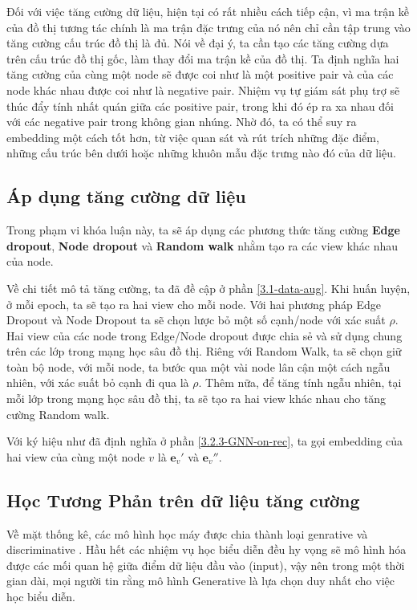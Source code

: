 Đối với việc tăng cường dữ liệu, hiện tại có rất nhiều cách tiếp cận, vì ma trận kề của đồ thị tương tác chính là ma trận đặc trưng của nó nên chỉ cần tập trung vào tăng cường cấu trúc đồ thị là đủ. Nói về đại ý, ta cần tạo các tăng cường dựa trên cấu trúc đồ thị gốc, làm thay đổi ma trận kề của đồ thị. Ta định nghĩa hai tăng cường của cùng một node sẽ được coi như là một positive pair và của các node khác nhau được coi như là negative pair. Nhiệm vụ tự giám sát phụ trợ sẽ thúc đẩy tính nhất quán giữa các positive pair, trong khi đó ép ra xa nhau đối với các negative pair trong không gian nhúng. Nhờ đó, ta có thể suy ra embedding một cách tốt hơn, từ việc quan sát và rút trích những đặc điểm, những cấu trúc bên dưới hoặc những khuôn mẫu đặc trưng nào đó của dữ liệu. 

\subsection{Áp dụng tăng cường dữ liệu}
\noindent Trong phạm vi khóa luận này, ta sẽ áp dụng các phương thức tăng cường \textbf{Edge dropout}, \textbf{Node dropout} và \textbf{Random walk} nhằm tạo ra các view khác nhau của node.

Về chi tiết mô tả tăng cường, ta đã đề cập ở phần \ref{3.1-data-aug}. Khi huấn luyện, ở mỗi epoch, ta sẽ tạo ra hai view cho mỗi node. Với hai phương pháp Edge Dropout và Node Dropout ta sẽ chọn lược bỏ một số cạnh/node với xác suất $\rho$. Hai view của các node trong Edge/Node dropout được chia sẻ và sử dụng chung trên các lớp trong mạng học sâu đồ thị. Riêng với Random Walk, ta sẽ chọn giữ toàn bộ node, với mỗi node, ta bước qua một vài node lân cận một cách ngẫu nhiên, với xác suất bỏ cạnh đi qua là $\rho$. Thêm nữa, để tăng tính ngẫu nhiên, tại mỗi lớp trong mạng học sâu đồ thị, ta sẽ tạo ra hai view khác nhau cho tăng cường Random walk.

Với ký hiệu như đã định nghĩa ở phần \ref{3.2.3-GNN-on-rec}, ta gọi embedding của hai view của cùng một node $v$ là $\mathbf{e}_v'$ và $\mathbf{e}_v''$.

\subsection{Học Tương Phản trên dữ liệu tăng cường}
\noindent Về mặt thống kê, các mô hình học máy được chia thành loại genrative và discriminative \cite{ssl-genorcont}. Hầu hết các nhiệm vụ học biểu diễn đều hy vọng sẽ mô hình hóa được các mối quan hệ giữa điểm dữ liệu đầu vào (input), vậy nên trong một thời gian dài, mọi người tin rằng mô hình Generative là lựa chọn duy nhất cho việc học biểu diễn.

